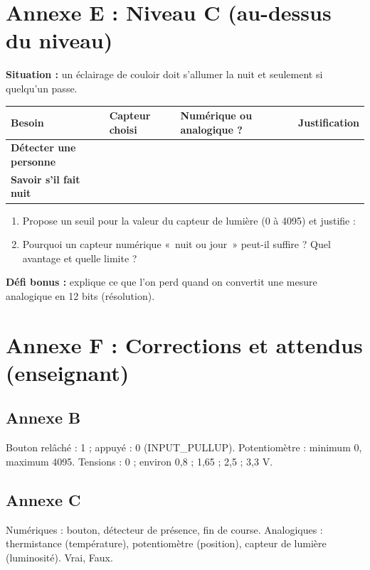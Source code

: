 \documentclass[11pt,a4paper]{article}
\begin{document}
\newpage
\section*{Annexe E : Niveau C (au-dessus du niveau)}

\textbf{Situation :} un éclairage de couloir doit s'allumer la nuit et seulement si quelqu'un passe.

\begin{tabularx}{\linewidth}{>{\bfseries}p{3.4cm}Y Y Y}
\toprule
Besoin & Capteur choisi & Numérique ou analogique ? & Justification\\
\midrule
Détecter une personne & & & \\
Savoir s'il fait nuit & & & \\
\bottomrule
\end{tabularx}

\begin{enumerate}
 \item Propose un seuil pour la valeur du capteur de lumière (0 à 4095) et justifie : \lig
 \item Pourquoi un capteur numérique «~nuit ou jour~» peut-il suffire ? Quel avantage et quelle limite ? \lig \lig
\end{enumerate}

\textbf{Défi bonus :} explique ce que l'on perd quand on convertit une mesure analogique en 12 bits (résolution).

\newpage
\section*{Annexe F : Corrections et attendus (enseignant)}

\subsection*{Annexe B}
Bouton relâché : 1 ; appuyé : 0 (INPUT\_PULLUP). Potentiomètre : minimum 0, maximum 4095. Tensions : 0 ; environ 0,8 ; 1,65 ; 2,5 ; 3,3 V.

\subsection*{Annexe C}
Numériques : bouton, détecteur de présence, fin de course. Analogiques : thermistance (température), potentiomètre (position), capteur de lumière (luminosité). Vrai, Faux.
\end{document}
